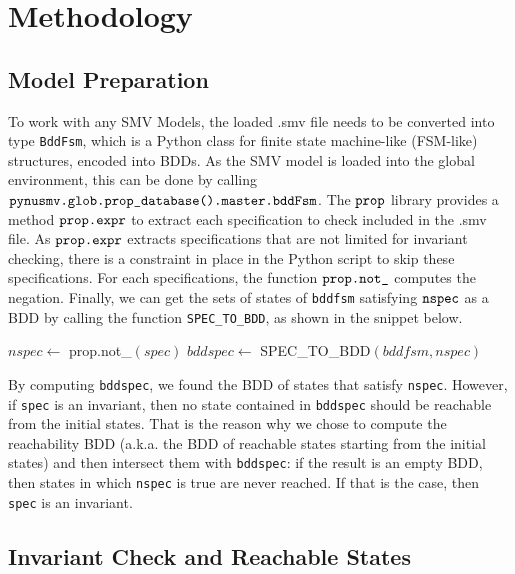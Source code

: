 \section{Methodology}

\subsection{Model Preparation} \label{subsec:modprep}

To work with any SMV Models, the loaded .smv file needs to be converted into type \texttt{BddFsm}, which is a Python class for finite state machine-like (FSM-like) structures, encoded into BDDs. As the SMV model is loaded into the global environment, this can be done by calling $\verb|pynusmv.glob.prop_database().master.bddFsm|$. The $\verb|prop|$ library provides a method $\verb|prop.expr|$ to extract each specification to check included in the .smv file. As $\verb|prop.expr|$ extracts specifications that are not limited for invariant checking, there is a constraint in place in the Python script to skip these specifications. For each specifications, the function $\verb|prop.not_|$ computes the negation. Finally, we can get the sets of states of \texttt{bddfsm} satisfying $\verb|nspec|$ as a BDD by calling the function \texttt{SPEC\_TO\_BDD}, as shown in the snippet below.

\medskip

\begin{algorithmic}[1]
\State $nspec \leftarrow$ prop.not\_$(spec)$
\State $bddspec \leftarrow$ SPEC\_TO\_BDD$(bddfsm, nspec)$
\end{algorithmic}

\medskip

By computing \texttt{bddspec}, we found the BDD of states that satisfy \texttt{nspec}. However, if \texttt{spec} is an invariant, then no state contained in \texttt{bddspec} should be reachable from the initial states. That is the reason why we chose to compute the reachability BDD (a.k.a. the BDD of reachable states starting from the initial states) and then intersect them with \texttt{bddspec}: if the result is an empty BDD, then states in which \texttt{nspec} is true are never reached. If that is the case, then \texttt{spec} is an invariant.

\subsection{Invariant Check and Reachable States} \label{subsec:invcheck}

